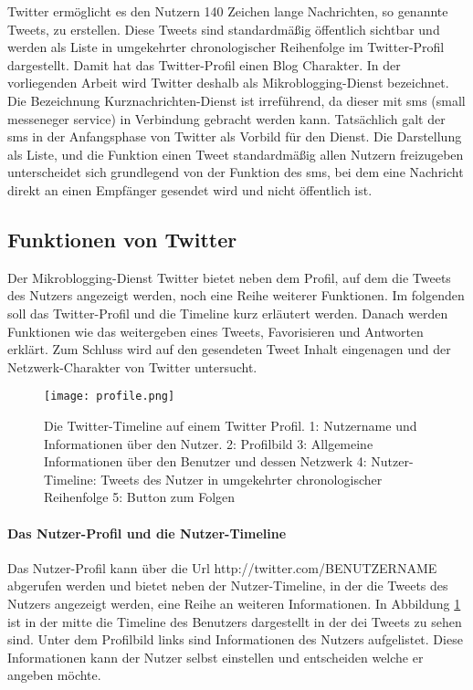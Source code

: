 	Twitter ermöglicht es den Nutzern 140 Zeichen lange Nachrichten, so genannte Tweets, zu erstellen. 
	Diese Tweets sind standardmäßig öffentlich sichtbar und werden als Liste in umgekehrter chronologischer Reihenfolge im Twitter-Profil dargestellt. 
	Damit hat das Twitter-Profil einen Blog Charakter.  
	In der vorliegenden Arbeit wird Twitter deshalb als Mikroblogging-Dienst bezeichnet.
	Die Bezeichnung Kurznachrichten-Dienst ist irreführend, da dieser mit sms (small messeneger service) in Verbindung gebracht werden kann. 
	Tatsächlich galt der sms in der Anfangsphase von Twitter als Vorbild für den Dienst.
	Die Darstellung als Liste, und die Funktion einen Tweet standardmäßig allen Nutzern freizugeben unterscheidet sich grundlegend von der Funktion des sms, bei dem eine Nachricht direkt an einen Empfänger gesendet wird und nicht öffentlich ist.

	\subsection{Funktionen von Twitter}
	Der Mikroblogging-Dienst Twitter bietet neben dem Profil, auf dem die Tweets des Nutzers angezeigt werden, noch eine Reihe weiterer Funktionen. 
	Im folgenden soll das Twitter-Profil und die Timeline kurz erläutert werden. 
	Danach werden Funktionen wie das weitergeben eines Tweets, Favorisieren und Antworten erklärt. 
	Zum Schluss wird auf den gesendeten Tweet Inhalt eingenagen und der Netzwerk-Charakter von Twitter untersucht.

	\begin{figure}[h!]
	\begin{center}
	\texttt{[image: profile.png]}
	\caption{Die Twitter-Timeline auf einem Twitter Profil. 1: Nutzername und Informationen über den Nutzer. 2: Profilbild
	3: Allgemeine Informationen über den Benutzer und dessen Netzwerk
	4: Nutzer-Timeline: Tweets des Nutzer in umgekehrter chronologischer Reihenfolge 
	5: Button zum Folgen}
	\label{twitterProfile}
	\end{center}
	\end{figure}


		\paragraph{Das Nutzer-Profil und die Nutzer-Timeline}
			Das Nutzer-Profil kann über die Url http://twitter.com/BENUTZERNAME abgerufen werden und bietet neben der Nutzer-Timeline, in der die Tweets des Nutzers angezeigt werden, eine Reihe an weiteren Informationen.
			In Abbildung \ref{twitterProfile} ist in der mitte die Timeline des Benutzers dargestellt in der dei Tweets zu sehen sind. 
			Unter dem Profilbild links sind Informationen des Nutzers aufgelistet.
			Diese Informationen kann der Nutzer selbst einstellen und entscheiden welche er angeben möchte.   


